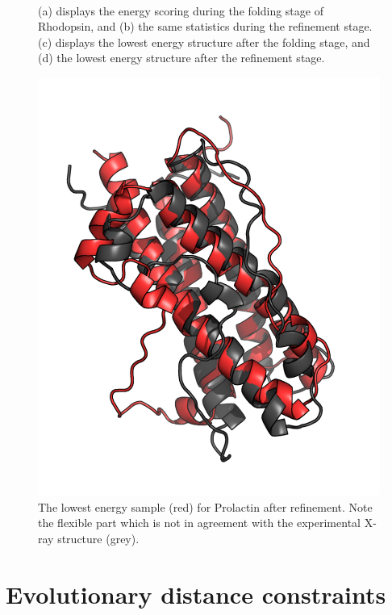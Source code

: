 \begin{figure}
{    }\\
    \caption{(a) displays the energy scoring during the folding stage of Rhodopsin, and (b) the same statistics during the refinement stage. (c) displays the lowest energy structure after the folding stage, and (d) the lowest energy structure after the refinement stage.}
    \label{fig:rhodopsin}%
\end{figure}


\begin{figure}%
    \centering
    \includegraphics[width=\textwidth]{figures/prolactin_lowest_e.pdf}
    \caption{The lowest energy sample (red) for Prolactin after refinement. Note the flexible part which is not in agreement with the experimental X-ray structure (grey).}
    \label{fig:prolactin}%
\end{figure}




\clearpage


\section{Evolutionary distance constraints}

